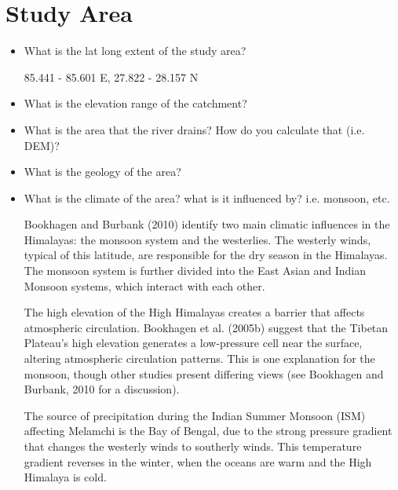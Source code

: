 
\section{Study Area}


\begin{itemize}

\item{What is the lat long extent of the study area?}

85.441 - 85.601 E, 27.822 - 28.157 N

\item{What is the elevation range of the catchment?}

\item{What is the area that the river drains? How do you calculate that (i.e. DEM)?}

\item{What is the geology of the area?}

\item{What is the climate of the area? what is it influenced by? i.e. monsoon, etc.}

Bookhagen and Burbank (2010) identify two main climatic influences in the Himalayas: the monsoon system and the westerlies. 
The westerly winds, typical of this latitude, are responsible for the dry season in the Himalayas.
The monsoon system is further divided into the East Asian and Indian Monsoon systems, which interact with each other.

The high elevation of the High Himalayas creates a barrier that affects atmospheric circulation. 
Bookhagen et al. (2005b) suggest that the Tibetan Plateau's high elevation generates a low-pressure cell near the surface, 
altering atmospheric circulation patterns. 
This is one explanation for the monsoon, though other studies present differing views (see Bookhagen and Burbank, 2010 for a discussion).

The source of precipitation during the Indian Summer Monsoon (ISM) affecting Melamchi is the Bay of Bengal, 
due to the strong pressure gradient that changes the westerly winds to southerly winds. This temperature gradient reverses in the winter,
when the oceans are warm and the High Himalaya is cold.






\end{itemize}
